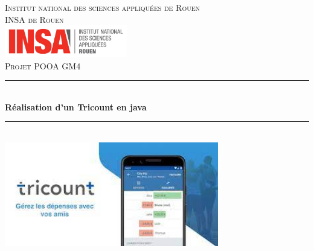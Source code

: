 \documentclass[12,french]{report}
\newcommand{\HRule}{\rule{\linewidth}{0.5mm}}
\begin{document}
\hypersetup{pdfborder=0 0 0}

\begin{titlepage}

\begin{center}
	\textsc{{\LARGE Institut national des sciences appliquées de Rouen} \\ 			\vspace{6mm} {\Large INSA de Rouen}} \\
	\vspace{5mm}
	\includegraphics[width=0.4\textwidth]{./Images/insa}\\[1.0 cm]

	\textsc{\Large Projet POOA GM4}\\[0.6cm]

	\HRule \\[0.5cm]
	{ \Huge \bfseries Réalisation d'un Tricount en java}\\[0.2cm]
	\HRule \\[0.75cm]

	\includegraphics[width=0.7\textwidth]{./Images/Tricount}\\[0.9 cm]


\end{center}
\end{titlepage}
\end{document}
